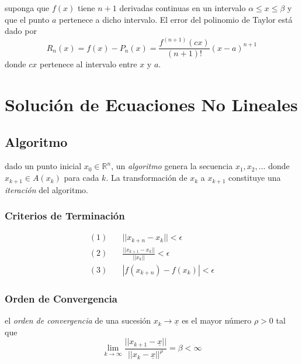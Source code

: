 \Teorema suponga que \(f(x)\) tiene \(n+1\) derivadas continuas en un
intervalo \(\alpha \leq x \leq \beta\) y que el punto \(a\) pertenece a
dicho intervalo. El error del polinomio de Taylor está dado por \[ 
R_n(x) = f(x) - P_n(x) = \frac{f^{(n+1)}(cx)}{(n+1)!} (x-a)^{n+1}  
\] donde \(cx\) pertenece al intervalo entre \(x\) y \(a\).

\hypertarget{soluciuxf3n-de-ecuaciones-no-lineales}{%
\section{Solución de Ecuaciones No
Lineales}\label{soluciuxf3n-de-ecuaciones-no-lineales}}

\hypertarget{algoritmo}{%
\subsection{Algoritmo}\label{algoritmo}}

\Definicion dado un punto inicial \(x_0 \in \ensuremath{\mathbb{R}}^n\),
un \emph{algoritmo} genera la secuencia \(x_1, x_2, ...\) donde
\(x_{k+1} \in A(x_k)\) para cada \(k\). La transformación de \(x_k\) a
\(x_{k+1}\) constituye una \emph{iteración} del algoritmo.

\hypertarget{criterios-de-terminaciuxf3n}{%
\subsubsection{Criterios de
Terminación}\label{criterios-de-terminaciuxf3n}}

\begin{align*}
(1) &\quad || x_{k+n} - x_k || < \epsilon \\
(2) &\quad \frac{|| x_{k+1} - x_k ||}{||x_k||} < \epsilon \\
(3) &\quad | f(x_{k+n}) - f(x_k) | < \epsilon
\end{align*}

\hypertarget{orden-de-convergencia}{%
\subsubsection{Orden de Convergencia}\label{orden-de-convergencia}}

\Definicion el \emph{orden de convergencia} de una sucesión
\(x_k \rightarrow \underline{x}\) es el mayor número \(\rho > 0\) tal
que \[ 
\ensuremath{\lim_{k \to \infty} \frac{|| x_{k+1} - \underline{x} ||}{||x_k - \underline{x}||^\rho}}
= \beta < \infty
\]

